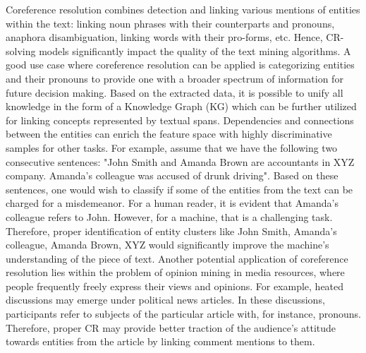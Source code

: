 Coreference resolution combines detection and linking various mentions of entities within the text: linking noun phrases with their counterparts and pronouns, anaphora disambiguation, linking words with their pro-forms, etc.  
Hence, CR-solving models significantly impact the quality of the text mining algorithms. 
A good use case where coreference resolution can be applied is categorizing entities and their pronouns to provide one with a broader spectrum of information for future decision making. Based on the extracted data, it is possible to unify all knowledge in the form of a Knowledge Graph (KG) \cite{kg-Wang2017} which can be further utilized for linking concepts represented by textual spans. 
Dependencies and connections between the entities can enrich the feature space with highly discriminative samples for other tasks. 
For example, assume that we have the following two consecutive sentences: "John Smith and Amanda Brown are accountants in XYZ company. Amanda's colleague was accused of drunk driving". Based on these sentences, one would wish to classify if some of the entities from the text can be charged for a misdemeanor. 
For a human reader, it is evident that Amanda's colleague refers to John. However, for a machine, that is a challenging task. Therefore, proper identification of entity clusters like {John Smith, Amanda's colleague}, {Amanda Brown}, {XYZ} would significantly improve the machine's understanding of the piece of text.
Another potential application of coreference resolution lies within the problem of opinion mining in media resources, where people frequently freely express their views and opinions.
For example, heated discussions may emerge under political news articles. In these discussions, participants refer to subjects of the particular article with, for instance, pronouns. Therefore, proper CR may provide better traction of the audience's attitude towards entities from the article by linking comment mentions to them.  



